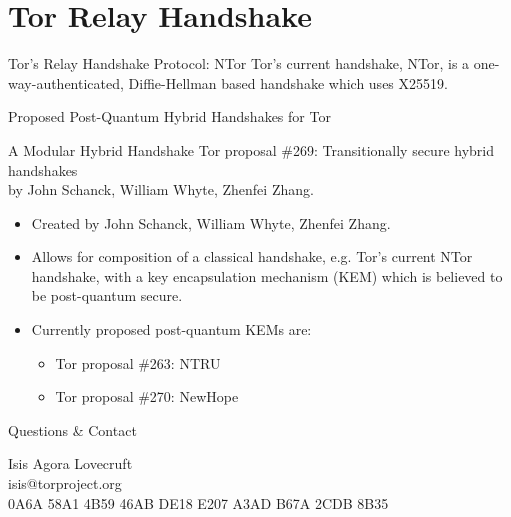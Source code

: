 \documentclass[9pt,a4paper,handout]{beamer}
\begin{document}
\section{Tor Relay Handshake}

\begin{frame}{Tor's Relay Handshake Protocol: NTor}
  Tor's current handshake, NTor, is a one-way-authenticated, Diffie-Hellman based handshake which
  uses X25519.

\end{frame}


\begin{frame}{Proposed Post-Quantum Hybrid Handshakes for Tor}
  \begin{block}{A Modular Hybrid Handshake}
    Tor proposal \#269: Transitionally secure hybrid handshakes \\
    by John Schanck, William Whyte, Zhenfei Zhang.

    \begin{itemize}
      \item<2-> Created by John Schanck, William Whyte, Zhenfei Zhang.
      \item<3-> Allows for composition of a classical handshake, e.g. Tor's current NTor handshake,
        with a key encapsulation mechanism (KEM) which is believed to be post-quantum secure.
      \item<4-> Currently proposed post-quantum KEMs are:
        \begin{itemize}
          \item<5-> Tor proposal \#263: NTRU
          \item<6-> Tor proposal \#270: NewHope
        \end{itemize}
    \end{itemize}
  \end{block}

\end{frame}

\begin{frame}{Questions \& Contact}
  \begin{center}
  Isis Agora Lovecruft\\
  isis@torproject.org \\
  0A6A 58A1 4B59 46AB DE18  E207 A3AD B67A 2CDB 8B35
  \end{center}
\end{frame}
\end{document}
